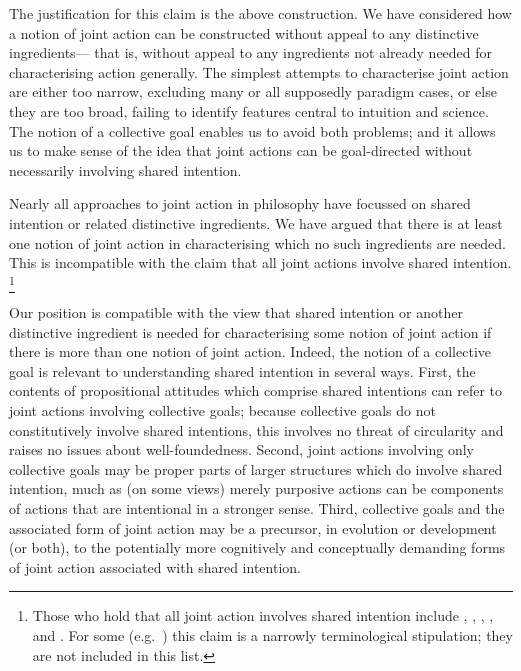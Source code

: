 \documentclass[12pt,a4paper]{extarticle}
\begin{document}
The justification for this claim is the above construction.
We have considered how a notion of joint action can be constructed without appeal to any distinctive ingredients---%
that is, without appeal to any ingredients not already needed for characterising action generally.
The simplest attempts to characterise joint action are either too narrow, excluding many or all supposedly paradigm cases, or else they are too broad, failing to identify features central to intuition and science.  
The notion of a collective goal enables us to avoid both problems; and it allows us to make sense of the idea that joint actions can be goal-directed without necessarily involving shared intention.

Nearly all approaches to joint action in philosophy have focussed on shared intention or related distinctive ingredients.
We have argued that 
	there is at least one notion of joint action in characterising which no such ingredients are needed.
This is incompatible with the claim that all joint actions involve shared intention.%
%
\footnote{ 
Those who hold that all joint action involves shared intention include 
	\citet[p.\ 381]{Carpenter:2009wq}, 
	\citet[p.\ 369]{Call:2009fk},
	\citet[p.\ 5]{Gilbert:2006wr},
	\citet{Kutz:2000si},
	\citet[p.\ 117]{rakoczy_pretend_2006}
	and 
	\citet{Tollefsen:2005vh}.
For some (e.g.\ \citet[p. 154-5]{petersson_collectivity_2007}) this claim is a narrowly terminological stipulation; they are not included in this list.
}
%


Our position is compatible with the view that shared intention or another distinctive ingredient is needed for characterising some notion of joint action
if there is more than one notion of joint action.
Indeed, the notion of a collective goal is relevant to understanding shared intention in several ways.
First, the contents of propositional attitudes which comprise shared intentions can refer to joint actions involving collective goals; because collective goals do not constitutively involve shared intentions, this involves no threat of circularity and raises no issues about well-foundedness.
Second, joint actions involving only collective goals may be proper parts of larger structures which do involve shared intention, much as (on some views) merely purposive actions can be components of actions that are intentional in a stronger sense.
Third, collective goals and the associated form of joint action may be a precursor, in evolution or development (or both), to the potentially more cognitively and conceptually demanding forms of joint action associated with shared intention.
\end{document}
